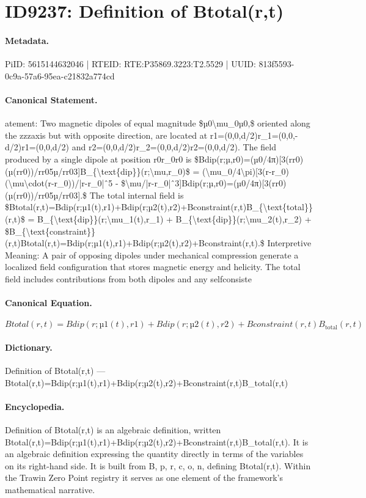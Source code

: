 \section*{ID9237: Definition of Btotal(r,t)}
\paragraph{Metadata.}
PiID: 5615144632046 | RTEID: RTE:P35869.3223:T2.5529 | UUID: 813f5593-0c9a-57a6-95ea-c21832a774cd

\paragraph{Canonical Statement.}
atement: Two magnetic dipoles of equal magnitude \$µ0\textbackslash{}mu\_0µ0,\$ oriented along the zzzaxis but with opposite direction, are located at r1=(0,0,d/2)r\_1=(0,0,-d/2)r1=(0,0,d/2) and r2=(0,0,d/2)r\_2=(0,0,d/2)r2=(0,0,d/2). The field produced by a single dipole at position r0r\_0r0 is \$Bdip(r;µ,r0)=(µ0/4π)[3(rr0)(µ(rr0))/rr05µ/rr03]B\_\{\textbackslash{}text\{dip\}\}(r;\textbackslash{}mu,r\_0)\$ = (\textbackslash{}mu\_0/4\textbackslash{}pi)[3(r-r\_0)(\textbackslash{}mu\textbackslash{}cdot(r-r\_0))/|r-r\_0|ˆ5 - \$\textbackslash{}mu/|r-r\_0|ˆ3]Bdip(r;µ,r0)=(µ0/4π)[3(rr0)(µ(rr0))/rr05µ/rr03].\$ The total internal field is \$Btotal(r,t)=Bdip(r;µ1(t),r1)+Bdip(r;µ2(t),r2)+Bconstraint(r,t)B\_\{\textbackslash{}text\{total\}\}(r,t)\$ = B\_\{\textbackslash{}text\{dip\}\}(r;\textbackslash{}mu\_1(t),r\_1) + B\_\{\textbackslash{}text\{dip\}\}(r;\textbackslash{}mu\_2(t),r\_2) + \$B\_\{\textbackslash{}text\{constraint\}\}(r,t)Btotal(r,t)=Bdip(r;µ1(t),r1)+Bdip(r;µ2(t),r2)+Bconstraint(r,t).\$ Interpretive Meaning: A pair of opposing dipoles under mechanical compression generate a localized field configuration that stores magnetic energy and helicity. The total field includes contributions from both dipoles and any selfconsiste

\paragraph{Canonical Equation.}
\[
Btotal(r,t)=Bdip(r;µ1(t),r1)+Bdip(r;µ2(t),r2)+Bconstraint(r,t)B_{\text{total}}(r,t)
\]

\paragraph{Dictionary.}
Definition of Btotal(r,t) — Btotal(r,t)=Bdip(r;µ1(t),r1)+Bdip(r;µ2(t),r2)+Bconstraint(r,t)B\_total(r,t)

\paragraph{Encyclopedia.}
Definition of Btotal(r,t) is an algebraic definition, written Btotal(r,t)=Bdip(r;µ1(t),r1)+Bdip(r;µ2(t),r2)+Bconstraint(r,t)B\_total(r,t). It is an algebraic definition expressing the quantity directly in terms of the variables on its right-hand side. It is built from B, p, r, c, o, n, defining Btotal(r,t). Within the Trawin Zero Point registry it serves as one element of the framework's mathematical narrative.
